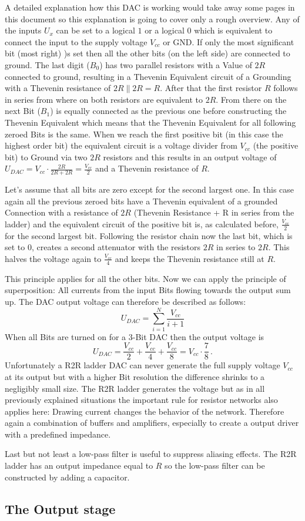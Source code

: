 A detailed explanation how this DAC is working would take away some pages in this document so this explanation is going to cover only a rough overview. Any of the inputs $U_x$ can be set to a logical $1$ or a logical $0$ which is equivalent to connect the input to the supply voltage $V_{cc}$ or GND. If only the most significant bit (most right) )s set then all the other bits (on the left side) are connected to ground. The last digit ($B_0$) has two parallel resistors with a Value of $2R$ connected to ground, resulting in a Thevenin Equivalent circuit of a Grounding with a Thevenin resistance of $2R \parallel 2R = R$. After that the first resistor $R$ follows in series from where on both resistors are equivalent to $2R$. From there on the next Bit ($B_1$) is equally connected as the previous one before constructing the Thevenin Equivalent which means that the Thevenin Equivalent for all following zeroed Bits is the same. When we reach the first positive bit (in this case the highest order bit) the equivalent circuit is a voltage divider from $V_{cc}$ (the positive bit) to Ground via two $2R$ resistors and this results in an output voltage of $U_{DAC} = V_{cc} \cdot \frac{2R}{2R + 2R} = \frac{V_{cc}}{2}$ and a Thevenin resistance of $R$.

Let's assume that all bits are zero except for the second largest one. In this case again all the previous zeroed bits have a Thevenin equivalent of a grounded Connection with a resistance of $2R$ (Thevenin Resistance + R in series from the ladder) and the equivalent circuit of the positive bit is, as calculated before, $\frac{V_{cc}}{2}$ for the second largest bit. Following the resistor chain now the last bit, which is set to $0$, creates a second attenuator with the resistors $2R$ in series to $2R$. This halves the voltage again to $\frac{V_{cc}}{4}$ and keeps the Thevenin resistance still at $R$.

This principle applies for all the other bits. Now we can apply the principle of superposition: All currents from the input Bits flowing towards the output sum up. The DAC output voltage can therefore be described as follows:
\[
U_{DAC} = \sum_{i = 1}^N \frac{V_{cc}}{i + 1}
\]
When all Bits are turned on for a 3-Bit DAC then the output voltage is
\[
	U_{DAC} = \frac{V_{cc}}{2} + \frac{V_{cc}}{4} + \frac{V_{cc}}{8} = V_{cc} \cdot \frac{7}{8}\,.
\]
Unfortunately a R2R ladder DAC can never generate the full supply voltage $V_{cc}$ at its output but with a higher Bit resolution the difference shrinks to a negligibly small size. The R2R ladder generates the voltage but as in all previously explained situations the important rule for resistor networks also applies here: Drawing current changes the behavior of the network. Therefore again a combination of buffers and amplifiers, especially to create a output driver with a predefined impedance.

Last but not least a low-pass filter is useful to suppress aliasing effects. The R2R ladder has an output impedance equal to $R$ so the low-pass filter can be constructed by adding a capacitor.

\subsection{The Output stage}

